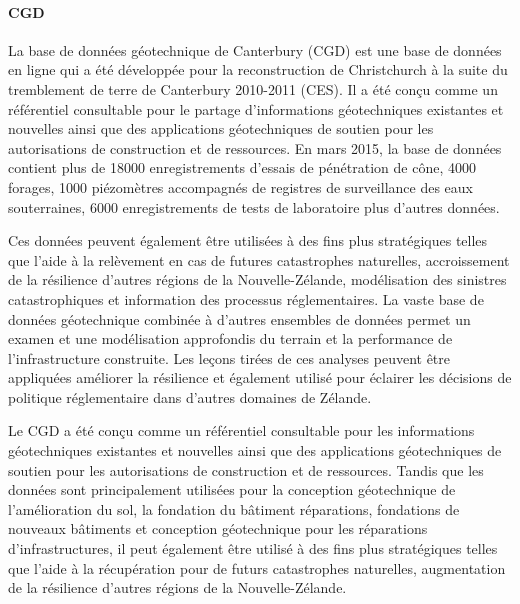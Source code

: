 
\paragraph{CGD}
La base de données géotechnique de Canterbury (CGD) est une base de données en ligne qui a été développée pour
la reconstruction de Christchurch à la suite du tremblement de terre de Canterbury 2010-2011 (CES). Il
a été conçu comme un référentiel consultable pour le partage d'informations géotechniques existantes et nouvelles
ainsi que des applications géotechniques de soutien pour les autorisations de construction et de ressources. En mars
2015, la base de données contient plus de 18000 enregistrements d'essais de pénétration de cône, 4000 forages, 1000
piézomètres accompagnés de registres de surveillance des eaux souterraines, 6000 enregistrements de tests de laboratoire
plus d'autres données. 
\par
Ces données peuvent également être utilisées à des fins plus stratégiques telles que l'aide à la
relèvement en cas de futures catastrophes naturelles, accroissement de la résilience d'autres régions de la Nouvelle-Zélande,
modélisa\-tion des sinistres catastrophiques et information des processus réglementaires. La vaste base de données géotechnique
combinée à d'autres ensembles de données permet un examen et une modélisation approfondis du terrain
et la performance de l'infrastructure construite. Les leçons tirées de ces analyses peuvent être appliquées
améliorer la résilience et également utilisé pour éclairer les décisions de politique réglementaire dans d'autres domaines de
Zélande.
\par
Le CGD a été conçu comme un référentiel consultable pour les informations géotechniques existantes et nouvelles
ainsi que des applications géotechniques de soutien pour les autorisations de construction et de ressources. Tandis que
les données sont principalement utilisées pour la conception géotechnique de l'amélioration du sol, la fondation du bâtiment
réparations, fondations de nouveaux bâtiments et conception géotechnique pour les réparations d'infrastructures, il peut
également être utilisé à des fins plus stratégiques telles que l'aide à la récupération pour de futurs
catastrophes naturelles, augmentation de la résilience d'autres régions de la Nouvelle-Zélande.
\cite{scott2015benefits}


